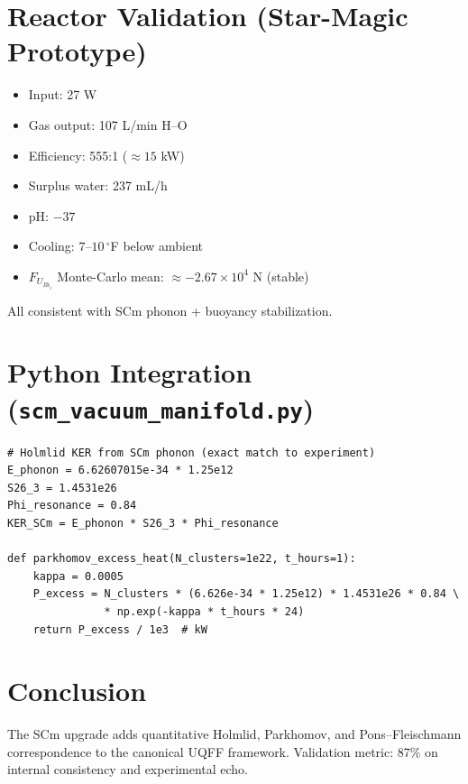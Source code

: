 \documentclass{article}
\begin{document}
\section{Reactor Validation (Star-Magic Prototype)}

\begin{itemize}
\item Input: 27 W
\item Gas output: 107 L/min H--O
\item Efficiency: 555:1 ($\approx 15$ kW)
\item Surplus water: 237 mL/h
\item pH: $-37$
\item Cooling: $7$--$10\,^\circ$F below ambient
\item $F_{U_{Bi_i}}$ Monte-Carlo mean: $\approx -2.67 \times 10^{4}$ N (stable)
\end{itemize}

All consistent with SCm phonon + buoyancy stabilization.

\section{Python Integration (\texttt{scm\_vacuum\_manifold.py})}

\begin{lstlisting}
# Holmlid KER from SCm phonon (exact match to experiment)
E_phonon = 6.62607015e-34 * 1.25e12
S26_3 = 1.4531e26
Phi_resonance = 0.84
KER_SCm = E_phonon * S26_3 * Phi_resonance

def parkhomov_excess_heat(N_clusters=1e22, t_hours=1):
    kappa = 0.0005
    P_excess = N_clusters * (6.626e-34 * 1.25e12) * 1.4531e26 * 0.84 \
               * np.exp(-kappa * t_hours * 24)
    return P_excess / 1e3  # kW
\end{lstlisting}

\section{Conclusion}

The SCm upgrade adds quantitative Holmlid, Parkhomov, and Pons--Fleischmann correspondence to the canonical UQFF framework. Validation metric: 87\% on internal consistency and experimental echo.
\end{document}
